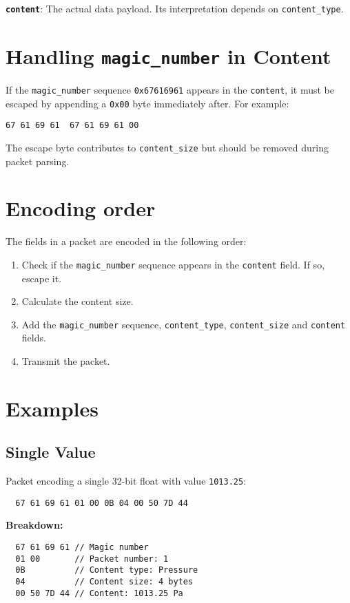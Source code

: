\documentclass[a4paper]{article}
\begin{document}
\textbf{\texttt{content}}: The actual data payload. Its interpretation depends on \texttt{content\_type}.

\section{Handling \texttt{magic\_number} in Content}
If the \texttt{magic\_number} sequence \texttt{0x67616961} appears in the \texttt{content}, it must be escaped by appending a \texttt{0x00} byte immediately after. For example:

\texttt{67 61 69 61 }\textrightarrow\texttt{ 67 61 69 61 00}

The escape byte contributes to \texttt{content\_size} but should be removed during packet parsing.

\section{Encoding order}
The fields in a packet are encoded in the following order:
\begin{enumerate}
  \item Check if the \texttt{magic\_number} sequence appears in the \texttt{content} field. If so, escape it.
  \item Calculate the content size.
  \item Add the \texttt{magic\_number} sequence, \texttt{content\_type}, \texttt{content\_size} and \texttt{content} fields.
  \item Transmit the packet.
\end{enumerate}

\section{Examples}
\subsection{Single Value}
Packet encoding a single 32-bit float with value \texttt{1013.25}:
\begin{verbatim}
  67 61 69 61 01 00 0B 04 00 50 7D 44
\end{verbatim}
\textbf{Breakdown:}
\begin{verbatim}
  67 61 69 61 // Magic number
  01 00       // Packet number: 1
  0B          // Content type: Pressure
  04          // Content size: 4 bytes
  00 50 7D 44 // Content: 1013.25 Pa
\end{verbatim}
\end{document}
